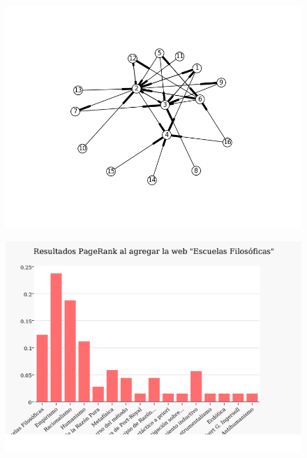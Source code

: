 \documentclass[a4paper]{article}
\begin{document}
\begin{figure}
  \begin{center}
	\includegraphics[scale=0.3]{imagenes/Exp2/grafo2}
	\label{grafo2}
  \end{center}
\end{figure}

\begin{figure}
 \begin{center}
	\includegraphics[scale=0.3]{imagenes/Exp2/PR2}
	\label{hitsa2}
  \end{center}
\end{figure}
\end{document}
